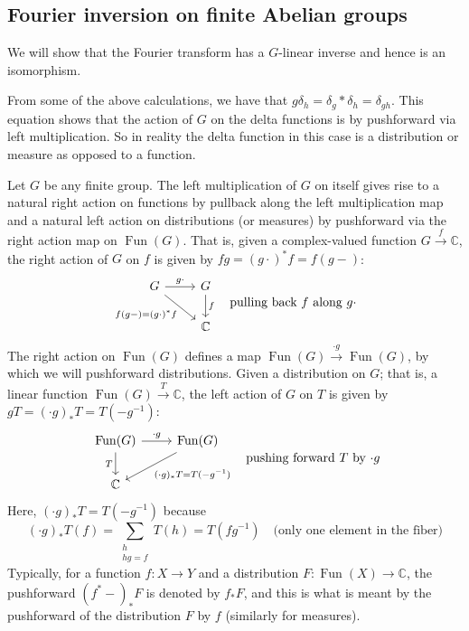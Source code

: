 \documentclass[11pt,leqno]{article}
\theoremstyle{plain}
\theoremstyle{definition}
\numberwithin{equation}{section}
\numberwithin{lem}{section}
\DeclareMathOperator{\Fun}{Fun}
\begin{document}
\subsection{Fourier inversion on finite Abelian groups}
We will show that the Fourier transform has a $G$-linear inverse and hence is an isomorphism. 

From some of the above calculations, we have that $g\delta_h = \delta_g\ast \delta_h = \delta_{gh}$. This equation shows that the action of $G$ on the delta functions is by pushforward via left multiplication. So in reality the delta function in this case is a distribution or measure as opposed to a function.

Let $G$ be any finite group. The left multiplication of $G$ on itself gives rise to a natural right action on functions by pullback along the left multiplication map and a natural left action on distributions (or measures) by pushforward via the right action map on $\Fun(G)$. That is, given a complex-valued function $G\xrightarrow{f}\mathbb C$, the right action of $G$ on $f$ is given by $fg = (g\cdot)^\ast f = f(g-)$:
\[\begin{tikzcd}[ampersand replacement=\&]
	G \& G \\
	\& {\mathbb C}
	\arrow["{g\cdot}", from=1-1, to=1-2]
	\arrow["{f(g-)=(g\cdot)^\ast f}"', from=1-1, to=2-2]
	\arrow["f", from=1-2, to=2-2]
\end{tikzcd} \quad \text{pulling back $f$ along $g\cdot$}\]
The right action on $\Fun(G)$ defines a map $\Fun(G)\xrightarrow{\cdot g}\Fun(G)$, by which we will pushforward distributions. Given a distribution on $G$; that is, a linear function $\Fun(G)\xrightarrow{T}\mathbb C$, the left action of $G$ on $T$ is given by $gT = (\cdot g)_\ast T = T(-g^{-1})$:
\[\begin{tikzcd}[ampersand replacement=\&]
	{\Fun(G)} \& {\Fun(G)} \\
	{\mathbb C}
	\arrow["{\cdot g}", from=1-1, to=1-2]
	\arrow["T"', from=1-1, to=2-1]
	\arrow["{(\cdot g)_\ast T= T(-g^{-1})}", from=1-2, to=2-1]
\end{tikzcd} \quad \text{pushing forward $T$ by $\cdot g$}\]
Here, $(\cdot g)_\ast T = T(-g^{-1})$ because
\[(\cdot g)_\ast T(f) = \sum_{\substack{h\\hg=f}}T(h) = T(fg^{-1})\quad \text{(only one element in the fiber)}\]
Typically, for a function $f\colon X\to Y$ and a distribution $F\colon \Fun(X)\to \mathbb C$, the pushforward $(f^\ast-)_\ast F$ is denoted by $f_\ast F$, and this is what is meant by the pushforward of the distribution $F$ by $f$ (similarly for measures).
\end{document}
